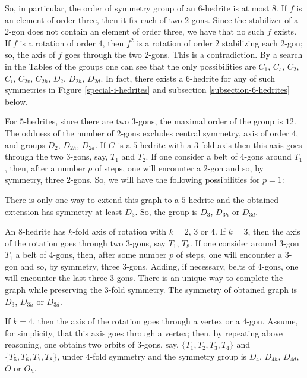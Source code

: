 \documentclass[12pt]{article}
\begin{document}
So, in particular, the order of symmetry group of an $6$-hedrite is at
most $8$. If $f$ is an element of order three, then it fix each of two
$2$-gons. Since the stabilizer of a $2$-gon does not contain an element
of order three, we have that no such $f$ exists. If $f$ is a rotation of
order $4$, then $f^2$ is a rotation of order $2$ stabilizing each $2$-gon;
so, the axis of $f$ goes through the two $2$-gons. This is a contradiction.
By a search in the Tables of the groups one can see that the only possibilities are $C_1$, $C_s$, $C_2$, $C_i$, $C_{2v}$, $C_{2h}$, $D_2$, $D_{2h}$, $D_{2d}$. In fact, there exists a $6$-hedrite for any of such symmetries in Figure \ref{special-i-hedrites} and subsection \ref{subsection-6-hedrites} below.

For $5$-hedrites, since there are two $3$-gons, the maximal order of the group is $12$. The oddness of the number of $2$-gons excludes central symmetry, axis of order $4$, and groups $D_2$, $D_{2h}$, $D_{2d}$.
If $G$ is a $5$-hedrite with a $3$-fold axis then this axis goes through
the two $3$-gons, say, $T_1$ and $T_2$. If one consider a belt of $4$-gons
around $T_1$, then, after a number $p$ of steps, one will encounter a
$2$-gon and so, by symmetry, three $2$-gons. So, we will have the 
following possibilities for $p=1$:

\begin{center}
\epsfxsize=60mm
\end{center}

There is only one way to extend this graph to a $5$-hedrite and the obtained extension has symmetry at least $D_3$. So, the group is $D_{3}$, $D_{3h}$ or $D_{3d}$.

An $8$-hedrite has $k$-fold axis of rotation with $k=2$, $3$ or $4$. 
If $k=3$, then the axis of the rotation goes through two $3$-gons,
say $T_1$, $T_8$. If one consider around $3$-gon $T_1$ a belt of 
$4$-gons, then, after some number $p$ of steps, one will encounter a 
$3$-gon and so, by symmetry, three $3$-gons. Adding, if necessary, 
belts of $4$-gons, one will encounter the last three $3$-gons.
There is an unique way to complete the graph while preserving
the $3$-fold symmetry. The symmetry of obtained graph is $D_3$,
$D_{3h}$ or $D_{3d}$.

If $k=4$, then the axis of the rotation goes through a vertex or
a $4$-gon. Assume, for simplicity, that this axis goes through a
vertex; then, by repeating above reasoning, one obtains two orbits of
$3$-gons, say, $\{T_1, T_2, T_3, T_4\}$ and $\{T_5, T_6, T_7, T_8\}$,
under $4$-fold symmetry and the symmetry group is $D_4$, $D_{4h}$,
$D_{4d}$, $O$ or $O_h$.
\end{document}
